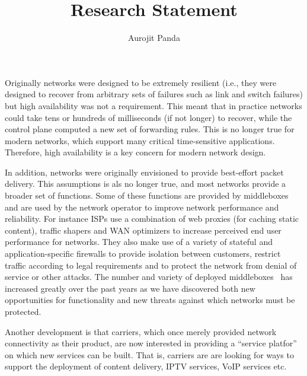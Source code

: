 \documentclass[letterpaper]{article}
\newcommand\eat[1]{}
\begin{document}
\title{\Large Research Statement}
\author{Aurojit Panda}
\date{}
\thispagestyle{empty}
\maketitle
Originally networks were designed to be extremely resilient (i.e., they were designed to recover from arbitrary sets of
failures such as link and switch failures) but high availability was not a requirement. This meant that in practice
networks could take tens or hundreds of milliseconds (if not longer) to recover, while the control plane computed  a new
set of forwarding rules. This is no longer true for modern networks, which support many critical time-sensitive
applications. Therefore, high availability is a key concern for modern network design.

In addition, networks were originally envisioned to provide best-effort packet delivery. This assumptions is als no
longer true, and most networks provide a broader set of functions. Some of these functions are provided by middleboxes and are
used by the network operator to improve network performance and reliability. For instance ISPs use a combination of web
proxies (for caching static content), traffic shapers and WAN optimizers to increase perceived end user performance for
networks. They also make use of a variety of stateful and application-specific firewalls to provide isolation between
customers, restrict traffic according to legal requirements and to protect the network from denial of service or other
attacks. The number and variety of deployed middleboxes~\cite{sherry2012making} has increased greatly over the past
years as we have discovered both new opportunities for functionality and new threats against which networks must be
protected.

Another development is that carriers, which once merely provided network connectivity as their product, are now
interested in providing a ``service platfor'' on which new services can be built. That is, carriers are are looking for
ways to support the deployment of content delivery, IPTV services, VoIP services etc. 

\eat{Secondly, customers (both end user and content providers) expect networks to be highly available: in particular
requiring little or no disruption during failures. Providing high availability means that networks can no longer wait
for control plane convergence (at least not for tens or hundreds of milliseconds) to restore connectivity (i.e. ensure
that there are paths from a source to a destination). Furthermore, any misconfiguration of middleboxes or switches can
be catastrophic, requiring that customers wait not just for control plane convergence but for human intervention. Modern
networks therefore need to protect against a wide variety of failure scenarios, including not just equipment failure but
also misconfiguration.}
\end{document}

